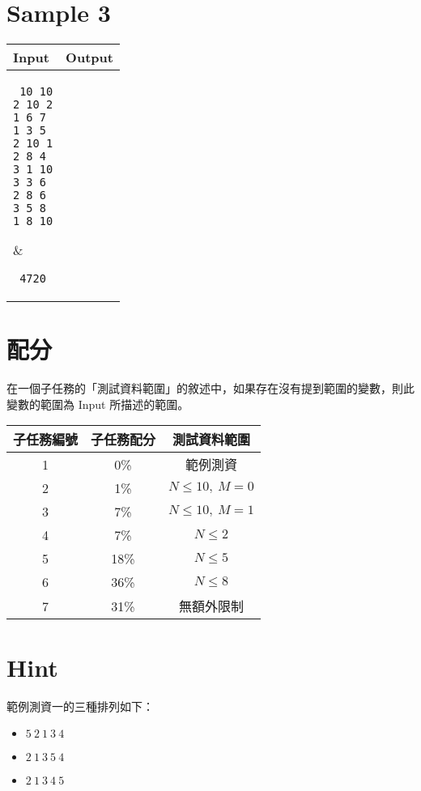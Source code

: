 \documentclass[11pt,a4paper]{article}
\begin{document}
\newpage
\section*{Sample 3}
\begin{longtable}[!h]{|p{}|p{}|}
\hline
\textbf {Input}	& \textbf {Output} \\
\hline
\parbox[t]{0.5\textwidth} %
{ \tt
10 10 \\
2 10 2 \\
1 6 7 \\
1 3 5 \\
2 10 1 \\
2 8 4 \\
3 1 10 \\
3 3 6 \\
2 8 6 \\
3 5 8 \\
1 8 10 \\
} &
\parbox[t]{0.5\textwidth}
{ \tt
4720 \\
} \\
\hline
\end{longtable}

\section*{配分}

在一個子任務的「測試資料範圍」的敘述中，如果存在沒有提到範圍的變數，則此變數的範圍為 Input 所描述的範圍。

\begin{center}
 \begin{tabular}{||c c c||} 
 \hline
 子任務編號 & 子任務配分 & 測試資料範圍 \\  
 \hline\hline
 1 & 0\% & 範例測資 \\ 
 \hline
 2 & 1\% & $N \le 10,\ M = 0$ \\
 \hline
 3 & 7\% & $N \le 10,\ M = 1$ \\
 \hline
 4 & 7\% & $N \le 2$ \\
 \hline
 5 & 18\% & $N \le 5$ \\
 \hline
 6 & 36\% & $N \le 8$ \\
 \hline
 7 & 31\% & 無額外限制 \\ 
 \hline
\end{tabular}
\end{center}

\section*{Hint}
範例測資一的三種排列如下：
\begin{itemize}
	\item $5\ 2\ 1\ 3\ 4$
	\item $2\ 1\ 3\ 5\ 4$
	\item $2\ 1\ 3\ 4\ 5$
\end{itemize}
\end{document}

